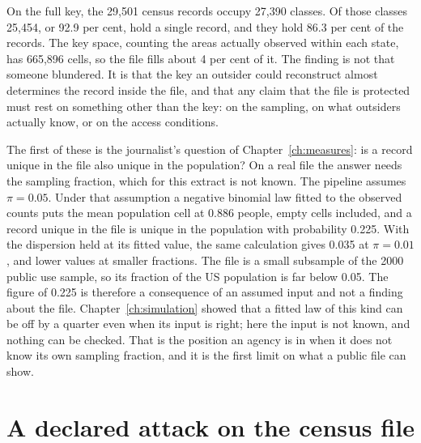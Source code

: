 On the full key, the 29,501 census records occupy 27,390 classes. Of those classes
25,454, or 92.9 per cent, hold a single record, and they hold 86.3 per cent of the
records.
The key space, counting the areas actually observed within each state, has 665,896
cells, so the file fills about 4 per cent of it.
The finding is not that someone blundered. It is that the key an outsider could
reconstruct almost determines the record inside the file, and that any claim that the
file is protected must rest on something other than the key: on the sampling, on what
outsiders actually know, or on the access conditions.

The first of these is the journalist's question of Chapter~\ref{ch:measures}: is a
record unique in the file also unique in the population? On a real file the answer
needs the sampling fraction, which for this extract is not known. The pipeline
assumes $\pi = 0.05$. Under that assumption a negative binomial law fitted to the
observed counts puts the mean population cell at 0.886 people, empty cells included,
and a record unique in the file is unique in the population with probability 0.225.
With the dispersion held at its fitted value, the same calculation gives 0.035 at
$\pi = 0.01$, and lower values at smaller fractions.
The file is a small subsample of the 2000 public use sample, so its fraction of the
US population is far below 0.05. The figure of 0.225 is therefore a consequence of an
assumed input and not a finding about the file. Chapter~\ref{ch:simulation} showed
that a fitted law of this kind can be off by a quarter even when its input is right;
here the input is not known, and nothing can be checked. That is the position an
agency is in when it does not know its own sampling fraction, and it is the first
limit on what a public file can show.

\section{A declared attack on the census file}

